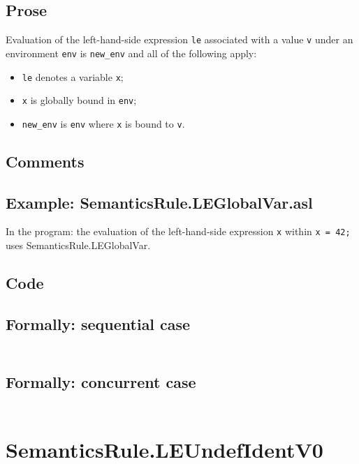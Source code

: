 \documentclass{book}
\begin{document}
    \subsection{Prose}
    Evaluation of the left-hand-side expression \texttt{le} associated with a
value \texttt{v} under an environment \texttt{env} is \texttt{new\_env} and all
of the following apply:
    \begin{itemize}
    \item \texttt{le} denotes a variable \texttt{x};
    \item \texttt{x} is globally bound in \texttt{env};
    \item \texttt{new\_env} is \texttt{env} where \texttt{x} is bound to \texttt{v}.
    \end{itemize}

    \subsection{Comments}

    \subsection{Example: SemanticsRule.LEGlobalVar.asl}
    In the program:
    the evaluation of the left-hand-side expression \texttt{x} within \texttt{x = 42;} uses SemanticsRule.LEGlobalVar.

  \subsection{Code}

  \subsection{Formally: sequential case}
  \begin{align}
  \end{align} 

  \subsection{Formally: concurrent case}
  \begin{align}
  \end{align} 

\section{SemanticsRule.LEUndefIdentV0 \label{sec:SemanticsRule.LEUndefIdentV0}}
\end{document}
